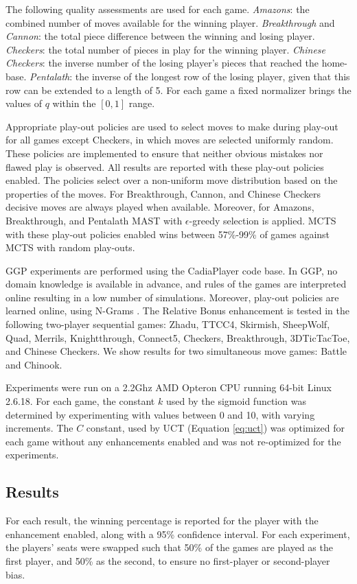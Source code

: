 \documentclass{ecai2014}
\begin{document}
The following quality assessments are used for each game. \emph{Amazons}: the combined number of moves available for the winning player. \emph{Breakthrough} and \emph{Cannon}: the total piece difference between the winning and losing player. \emph{Checkers}: the total number of pieces in play for the winning player. \emph{Chinese Checkers}: the inverse number of the losing player's pieces that reached the home-base. \emph{Pentalath}: the inverse of the longest row of the losing player, given that this row can be extended to a length of 5. For each game a fixed normalizer brings the values of $q$ within the $[0,1]$ range. 

Appropriate play-out policies are used to select moves to make during play-out for all games except Checkers, in which moves are selected uniformly random. These policies are implemented to ensure that neither obvious mistakes nor flawed play is observed. All results are reported with these play-out policies enabled. The policies select over a non-uniform move distribution based on the properties of the moves. For Breakthrough, Cannon, and Chinese Checkers decisive moves are always played when available. Moreover, for Amazons, Breakthrough, and Pentalath MAST \cite{finnsson2008simulation} with $\epsilon$-greedy selection is applied. MCTS with these play-out policies enabled wins between 57\%-99\% of games against MCTS with random play-outs. 

GGP experiments are performed using the {\sc CadiaPlayer} code base. In GGP, no domain knowledge is available in advance, and rules of the games are interpreted online resulting in a low number of simulations. Moreover, play-out policies are learned online, using N-Grams \cite{Tak2012}. The Relative Bonus enhancement is tested in the following two-player sequential games: Zhadu, TTCC4, Skirmish, SheepWolf, Quad, Merrils, Knightthrough, Connect5, Checkers, Breakthrough, 3DTicTacToe, and Chinese Checkers. We show results for two simultaneous move games: Battle and Chinook.

Experiments were run on a 2.2Ghz AMD Opteron CPU running 64-bit Linux 2.6.18. For each game, the constant $k$ used by the sigmoid function was determined by experimenting with values between 0 and 10, with varying increments. The $C$ constant, used by UCT (Equation \ref{eq:uct}) was optimized for each game without any enhancements enabled and was not re-optimized for the experiments.
\subsection{Results}
\label{subsec:results}
For each result, the winning percentage is reported for the player with the enhancement enabled, along with a 95\% confidence interval. For each experiment, the players' seats were swapped such that 50\% of the games are played as the first player, and 50\% as the second, to ensure no first-player or second-player bias.
\end{document}
